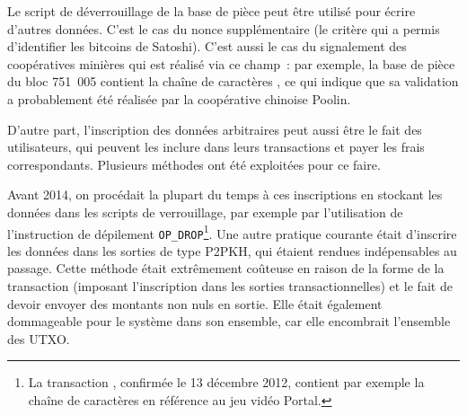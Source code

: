 Le script de déverrouillage de la base de pièce peut être utilisé pour écrire d'autres données. C'est le cas du nonce supplémentaire (le critère qui a permis d'identifier les bitcoins de Satoshi). C'est aussi le cas du signalement des coopératives minières qui est réalisé via ce champ~: par exemple, la base de pièce du bloc 751~005 contient la chaîne de caractères , ce qui indique que sa validation a probablement été réalisée par la coopérative chinoise Poolin.

D'autre part, l'inscription des données arbitraires peut aussi être le fait des utilisateurs, qui peuvent les inclure dans leurs transactions et payer les frais correspondants. Plusieurs méthodes ont été exploitées pour ce faire.

Avant 2014, on procédait la plupart du temps à ces inscriptions en stockant les données dans les scripts de verrouillage, par exemple par l'utilisation de l'instruction de dépilement \texttt{OP\_DROP}\footnote{La transaction , confirmée le 13 décembre 2012, contient par exemple la chaîne de caractères  en référence au jeu vidéo Portal.}. Une autre pratique courante était d'inscrire les données dans les sorties de type P2PKH, qui étaient rendues indépensables au passage. Cette méthode était extrêmement coûteuse en raison de la forme de la transaction (imposant l'inscription dans les sorties transactionnelles) et le fait de devoir envoyer des montants non nuls en sortie. Elle était également dommageable pour le système dans son ensemble, car elle encombrait l'ensemble des UTXO.

